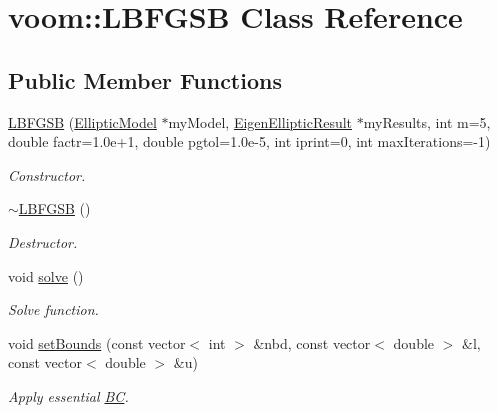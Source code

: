 \hypertarget{classvoom_1_1_l_b_f_g_s_b}{
\section{voom::LBFGSB Class Reference}
\label{classvoom_1_1_l_b_f_g_s_b}
}
\subsection*{Public Member Functions}
\begin{DoxyCompactItemize}
\item 
\hypertarget{classvoom_1_1_l_b_f_g_s_b_a053c5693075cddbfa64a062e32e19c06}{
\hyperlink{classvoom_1_1_l_b_f_g_s_b_a053c5693075cddbfa64a062e32e19c06}{LBFGSB} (\hyperlink{classvoom_1_1_elliptic_model}{EllipticModel} $\ast$myModel, \hyperlink{structvoom_1_1_eigen_elliptic_result}{EigenEllipticResult} $\ast$myResults, int m=5, double factr=1.0e+1, double pgtol=1.0e-\/5, int iprint=0, int maxIterations=-\/1)}
\label{classvoom_1_1_l_b_f_g_s_b_a053c5693075cddbfa64a062e32e19c06}

\begin{DoxyCompactList}\small\item\em Constructor. \item\end{DoxyCompactList}\item 
\hypertarget{classvoom_1_1_l_b_f_g_s_b_a29cb60127508be928c7152f160113a71}{
\hyperlink{classvoom_1_1_l_b_f_g_s_b_a29cb60127508be928c7152f160113a71}{$\sim$LBFGSB} ()}
\label{classvoom_1_1_l_b_f_g_s_b_a29cb60127508be928c7152f160113a71}

\begin{DoxyCompactList}\small\item\em Destructor. \item\end{DoxyCompactList}\item 
\hypertarget{classvoom_1_1_l_b_f_g_s_b_a6cf27127b3b19100b5d7e21d84ab6995}{
void \hyperlink{classvoom_1_1_l_b_f_g_s_b_a6cf27127b3b19100b5d7e21d84ab6995}{solve} ()}
\label{classvoom_1_1_l_b_f_g_s_b_a6cf27127b3b19100b5d7e21d84ab6995}

\begin{DoxyCompactList}\small\item\em Solve function. \item\end{DoxyCompactList}\item 
\hypertarget{classvoom_1_1_l_b_f_g_s_b_a4edb93e1772c195bfb9453d20848ba9f}{
void \hyperlink{classvoom_1_1_l_b_f_g_s_b_a4edb93e1772c195bfb9453d20848ba9f}{setBounds} (const vector$<$ int $>$ \&nbd, const vector$<$ double $>$ \&l, const vector$<$ double $>$ \&u)}
\label{classvoom_1_1_l_b_f_g_s_b_a4edb93e1772c195bfb9453d20848ba9f}

\begin{DoxyCompactList}\small\item\em Apply essential \hyperlink{struct_b_c}{BC}. \item\end{DoxyCompactList}\end{DoxyCompactItemize}
